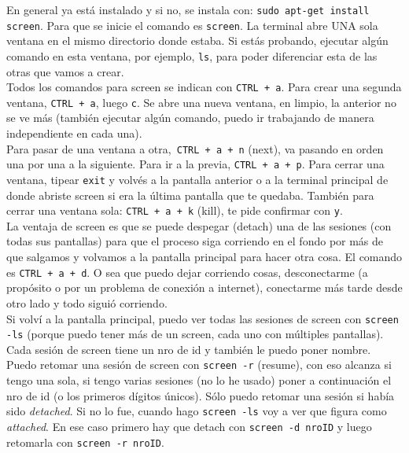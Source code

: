 \documentclass[paper=a4, fontsize=11pt]{scrartcl} %
\numberwithin{equation}{section} %
\numberwithin{figure}{section} %
\numberwithin{table}{section} %
\begin{document}
En general ya está instalado y si no, se instala con: \texttt{sudo apt-get install screen}. Para que se inicie el comando es \texttt{screen}. La terminal abre UNA sola ventana en el mismo directorio donde estaba. Si estás probando, ejecutar algún comando en esta ventana, por ejemplo, \texttt{ls}, para poder diferenciar esta de las otras que vamos a crear. \\

Todos los comandos para screen se indican con \texttt{CTRL + a}. Para crear una segunda ventana, \texttt{CTRL + a}, luego \texttt{c}. Se abre una nueva ventana, en limpio, la anterior no se ve más (también ejecutar algún comando, puedo ir trabajando de manera independiente en cada una). \\

Para pasar de una ventana a otra,\texttt{ CTRL + a + n} (next), va pasando en orden una por una a la siguiente. Para ir a la previa, \texttt{CTRL + a + p}. Para cerrar una ventana, tipear \texttt{exit} y volvés a la pantalla anterior o a la terminal principal de donde abriste screen si era la última pantalla que te quedaba.  También para cerrar una ventana sola: \texttt{CTRL + a + k} (kill), te pide confirmar con \texttt{y}.\\

La ventaja de screen es que se puede despegar (detach) una de las sesiones (con todas sus pantallas) para que el proceso siga corriendo en el fondo por más de que salgamos y volvamos a la pantalla principal para hacer otra cosa. El comando es \texttt{CTRL + a + d}. O sea que puedo dejar corriendo cosas, desconectarme (a propósito o por un problema de conexión a internet), conectarme más tarde desde otro lado y todo siguió corriendo. \\

Si volví a la pantalla principal, puedo ver todas las sesiones de screen con \texttt{screen -ls} (porque puedo tener más de un screen, cada uno con múltiples pantallas). Cada sesión de screen tiene un nro de id y también le puedo poner nombre. Puedo retomar una sesión de screen con \texttt{screen -r} (resume), con eso alcanza si tengo una sola, si tengo varias sesiones (no lo he usado) poner a continuación el nro de id (o los primeros dígitos únicos). Sólo puedo retomar una sesión si había sido \textit{detached}. Si no lo fue, cuando hago \texttt{screen -ls} voy a ver que figura como \textit{attached}. En ese caso primero hay que detach con \texttt{screen -d nroID} y luego retomarla con \texttt{screen -r nroID}.\\
 
\end{document}
